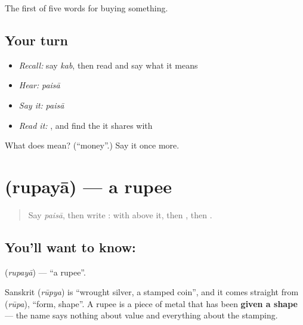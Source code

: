 \begin{grammarlens}[title={What you've built}]
The first of five words for buying something.
\end{grammarlens}

\subsection*{Your turn}
\begin{itemize}
\raggedright
  \item \emph{Recall:} say \emph{kab}, then read \textbf{} and say what it means
  \item \emph{Hear:} \emph{paisā}
  \item \emph{Say it:} \emph{paisā}
  \item \emph{Read it:} , and find the  it shares with 
\end{itemize}

\begin{tcolorbox}[breakable,colback=teal!4,colframe=teal!35!black,title={Before you move on}]
What does  mean? (\textquotedblleft{}money\textquotedblright{}.) Say it once more.
\end{tcolorbox}
\section[rupayā]{ (rupayā) — a rupee}

\label{lesson:HI-C72-rupee}



\begin{quote}
Say \emph{paisā}, then write \textbf{}:  with  above it, then , then .
\end{quote}

\subsection*{You'll want to know: }
\textbf{} (\emph{rupayā}) — \textquotedblleft{}a rupee\textquotedblright{}.

Sanskrit  (\emph{rūpya}) is \textquotedblleft{}wrought silver, a stamped coin\textquotedblright{}, and it comes straight from \textbf{} (\emph{rūpa}), \textquotedblleft{}form, shape\textquotedblright{}. A rupee is a piece of metal that has been \textbf{given a shape} — the name says nothing about value and everything about the stamping.

